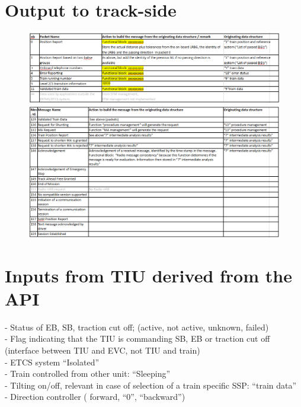 \documentclass{template/openetcs_report}
\begin{document}
\section{Output to track-side}
\newpage
\begin{figure}
\centering
\includegraphics[scale=0.4]{images/DataFlowUA6}
\centering
\includegraphics[scale=0.4]{images/DataFlowUA7}
\end{figure}
\newpage

\section{Inputs from TIU derived from the API}

- Status of EB, SB, traction cut off;  (active, not active, unknown, failed)\\

- Flag indicating that the TIU is commanding SB, EB or traction cut off  (interface between TIU and EVC, not TIU and train)\\

- ETCS system “Isolated”\\

- Train controlled from other unit: “Sleeping”\\

- Tilting on/off, relevant in case of selection of a train specific SSP: “train data”\\

- Direction controller ( forward, “0”, “backward”)\\
\end{document}
